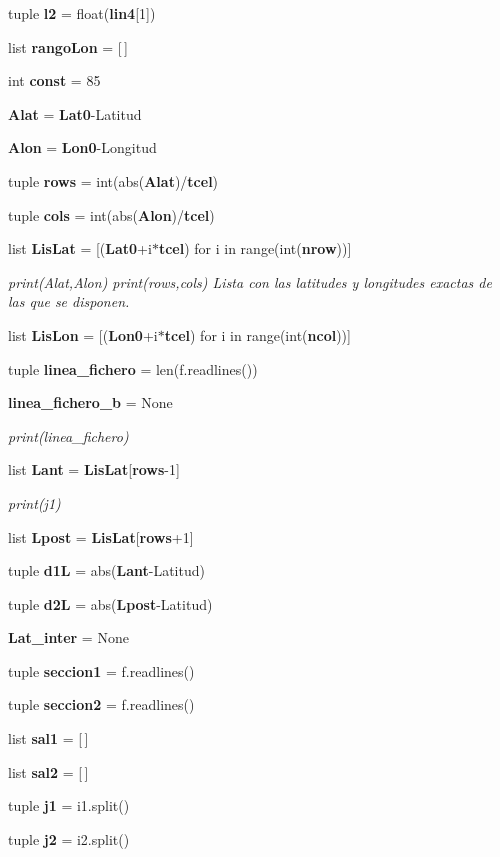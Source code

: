 \begin{DoxyCompactItemize}
tuple {\bf l2} = float({\bf lin4}[1])
\item 
list {\bf rango\-Lon} = [$\,$]
\item 
int {\bf const} = 85
\item 
{\bf Alat} = {\bf Lat0}-\/Latitud
\item 
{\bf Alon} = {\bf Lon0}-\/Longitud
\item 
tuple {\bf rows} = int(abs({\bf Alat})/{\bf tcel})
\item 
tuple {\bf cols} = int(abs({\bf Alon})/{\bf tcel})
\item 
list {\bf Lis\-Lat} = [({\bf Lat0}+i$\ast${\bf tcel}) for i in range(int({\bf nrow}))]
\begin{DoxyCompactList}\small\item\em print(\-Alat,\-Alon) print(rows,cols) Lista con las latitudes y longitudes exactas de las que se disponen. \end{DoxyCompactList}\item 
list {\bf Lis\-Lon} = [({\bf Lon0}+i$\ast${\bf tcel}) for i in range(int({\bf ncol}))]
\item 
tuple {\bf linea\-\_\-fichero} = len(f.\-readlines())
\item 
{\bf linea\-\_\-fichero\-\_\-b} = None
\begin{DoxyCompactList}\small\item\em print(linea\-\_\-fichero) \end{DoxyCompactList}\item 
list {\bf Lant} = {\bf Lis\-Lat}[{\bf rows}-\/1]
\begin{DoxyCompactList}\small\item\em print(j1) \end{DoxyCompactList}\item 
list {\bf Lpost} = {\bf Lis\-Lat}[{\bf rows}+1]
\item 
tuple {\bf d1\-L} = abs({\bf Lant}-\/Latitud)
\item 
tuple {\bf d2\-L} = abs({\bf Lpost}-\/Latitud)
\item 
{\bf Lat\-\_\-inter} = None
\item 
tuple {\bf seccion1} = f.\-readlines()
\item 
tuple {\bf seccion2} = f.\-readlines()
\item 
list {\bf sal1} = [$\,$]
\item 
list {\bf sal2} = [$\,$]
\item 
tuple {\bf j1} = i1.\-split()
\item 
tuple {\bf j2} = i2.\-split()

\end{DoxyCompactItemize}
